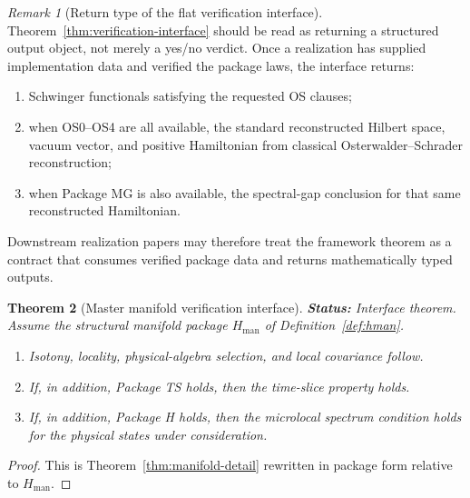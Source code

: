 \documentclass[12pt,a4paper]{article}
\theoremstyle{plain}
\newtheorem{theorem}{Theorem}[section]
\theoremstyle{definition}
\theoremstyle{remark}
\newtheorem{remark}[theorem]{Remark}
\newcommand{\status}[1]{\textnormal{\textbf{Status:} #1.}\ }
\begin{document}
\begin{remark}[Return type of the flat verification interface]
  Theorem~\ref{thm:verification-interface} should be read as returning a
  structured output object, not merely a yes/no verdict. Once a realization
  has supplied implementation data and verified the package laws, the interface
  returns:
  \begin{enumerate}[nosep,label=(\roman*)]
  \item Schwinger functionals satisfying the requested OS clauses;
  \item when OS0--OS4 are all available, the standard reconstructed Hilbert
    space, vacuum vector, and positive Hamiltonian from classical
    Osterwalder--Schrader reconstruction;
  \item when Package MG is also available, the spectral-gap conclusion for that
    same reconstructed Hamiltonian.
  \end{enumerate}
  Downstream realization papers may therefore treat the framework theorem as a
  contract that consumes verified package data and returns mathematically typed
  outputs.
\end{remark}

\begin{theorem}[Master manifold verification interface]
  \label{thm:verification-interface-manifold}
  \status{Interface theorem}
  Assume the structural manifold package $H_{\mathrm{man}}$ of
  Definition~\ref{def:hman}.
  \begin{enumerate}[nosep,label=(\alph*)]
  \item Isotony, locality, physical-algebra selection, and local
    covariance follow.
  \item If, in addition, Package TS holds, then the time-slice
    property holds.
  \item If, in addition, Package H holds, then the microlocal spectrum
    condition holds for the physical states under consideration.
  \end{enumerate}
\end{theorem}
\begin{proof}
  This is Theorem~\ref{thm:manifold-detail} rewritten in package form
  relative to $H_{\mathrm{man}}$.
\end{proof}
\end{document}
